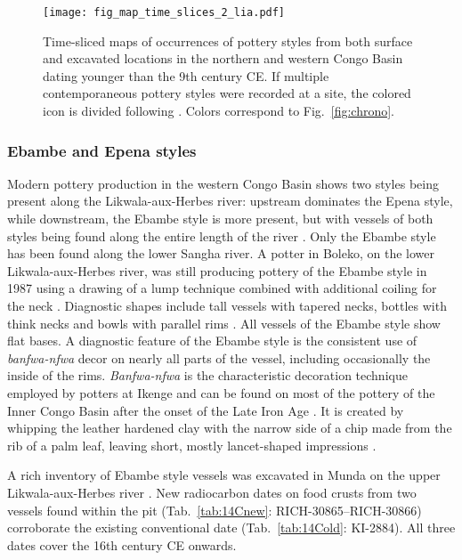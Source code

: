\documentclass[smallextended,natbib]{svjour3}       %
\begin{document}
\begin{figure}[!tbp]
	\centering
	\texttt{[image: fig\_map\_time\_slices\_2\_lia.pdf]}
	\caption{Time-sliced maps of occurrences of pottery styles from both surface and excavated locations in the northern and western Congo Basin dating younger than the 9th century CE. If multiple contemporaneous pottery styles were recorded at a site, the colored icon is divided following \citet[218--244 Fig.~100--107]{Seidensticker.2021e}. Colors correspond to Fig.~\ref{fig:chrono}.}
	\label{fig:timeslices_2_lia}
\end{figure}

\subsubsection*{Ebambe and Epena styles}

Modern pottery production in the western Congo Basin shows two styles being present along the Likwala-aux-Herbes river: upstream dominates the Epena style, while downstream, the Ebambe style is more present, but with vessels of both styles being found along the entire length of the river \citep[131--141]{Seidensticker.2021e}. Only the Ebambe style has been found along the lower Sangha river. A potter in Boleko, on the lower Likwala-aux-Herbes river, was still producing pottery of the Ebambe style in 1987 using a drawing of a lump technique combined with additional coiling for the neck \citep{Eggert.inVorb.}. Diagnostic  shapes include tall vessels with tapered necks, bottles with think necks and bowls with parallel rims \citep[Fig.~\ref{fig:sangha}.13--14;][132 Fig.~57]{Seidensticker.2021e}. All vessels of the Ebambe style show flat bases. A diagnostic feature of the Ebambe style is the consistent use of \textit{banfwa-nfwa} decor on nearly all parts of the vessel, including occasionally the inside of the rims. \textit{Banfwa-nfwa} is the characteristic decoration technique employed by potters at Ikenge \citep[399]{Eggert.1980c} and can be found on most of the pottery of the Inner Congo Basin after the onset of the Late Iron Age \citep[109--111]{Wotzka.1995}. It is created by whipping the leather hardened clay with the narrow side of a chip made from the rib of a palm leaf, leaving short, mostly lancet-shaped impressions \citep[Fig.~\ref{fig:sangha}.13--14; \ref{fig:ubangi}.16,25;][386 Ftn.~5]{Eggert.1980b}.

A rich inventory of Ebambe style vessels was excavated in Munda on the upper Likwala-aux-Herbes river \citep[311--321]{Seidensticker.2021e}. New radiocarbon dates on food crusts from two vessels found within the pit (Tab.~\ref{tab:14Cnew}: RICH-30865--RICH-30866) corroborate the existing conventional date (Tab.~\ref{tab:14Cold}: KI-2884). All three dates cover the 16th century CE onwards.
\end{document}
